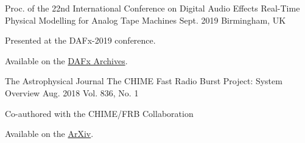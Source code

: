 \begin{cventries}
  \cventry
    {Proc. of the 22nd International Conference on Digital Audio Effects} %
    {Real-Time Physical Modelling for Analog Tape Machines} %
    {Sept. 2019} %
    {Birmingham, UK} %
    {
      \begin{cvitems} %
        \item {Presented at the DAFx-2019 conference.}
        \item {Available on the \href{http://www.dafx.de/paper-archive/2019/DAFx2019_paper_3.pdf}{DAFx Archives}.}
      \end{cvitems}
    }

  \cventry
    {The Astrophysical Journal} %
    {The CHIME Fast Radio Burst Project: System Overview} %
    {Aug. 2018} %
    {Vol. 836, No. 1} %
    {
      \begin{cvitems} %
        \item {Co-authored with the CHIME/FRB Collaboration}
        \item {Available on the \href{https://arxiv.org/abs/1803.11235}{ArXiv}.}
      \end{cvitems}
    }


\end{cventries}
